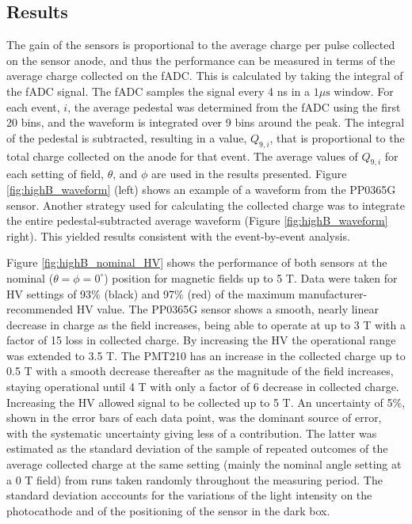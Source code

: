 \subsection{Results}
The gain of the sensors is proportional to the average charge per pulse collected on the sensor anode, and thus the performance can be measured in terms of the average charge collected on the fADC. This is calculated by taking the integral of the fADC signal. The fADC samples the signal every 4 ns in a $1 \mu\text{s}$ window. For each event, $i$, the average pedestal was determined from the fADC using the first 20 bins, and the waveform is integrated over 9 bins around the peak. The integral of the pedestal is subtracted, resulting in a value, $Q_{9,i}$, that is proportional to the total charge collected on the anode for that event. The average values of $Q_{9,i}$ for each setting of field, $\theta$, and $\phi$ are used in the results presented. Figure \ref{fig:highB_waveform} (left) shows an example of a waveform from the PP0365G sensor. Another strategy used for calculating the collected charge was to integrate the entire pedestal-subtracted average waveform (Figure \ref{fig:highB_waveform} right). This yielded results consistent with the event-by-event analysis.

Figure \ref{fig:highB_nominal_HV} shows the performance of both sensors at the nominal ($\theta = \phi = 0^{\circ}$) position for magnetic fields up to 5 T. Data were taken for HV settings of 93\% (black) and 97\% (red) of the maximum manufacturer-recommended HV value. The PP0365G sensor shows a smooth, nearly linear decrease in charge as the field increases, being able to operate at up to 3 T with a factor of 15 loss in collected charge. By increasing the HV the operational range was extended to 3.5 T. The PMT210 has an increase in the collected charge up to 0.5 T with a smooth decrease thereafter as the magnitude of the field increases, staying operational until 4 T with only a factor of 6 decrease in collected charge. Increasing the HV allowed signal to be collected up to 5 T. An uncertainty of 5\%, shown in the error bars of each data point, was the dominant source of error, with the systematic uncertainty giving less of a contribution. The latter was estimated as the standard deviation of the sample of repeated outcomes of the average collected charge at the same setting (mainly the nominal angle setting at a 0 T field) from runs taken randomly throughout the measuring period. The standard deviation acccounts for the variations of the light intensity on the photocathode and of the positioning of the sensor in the dark box.

